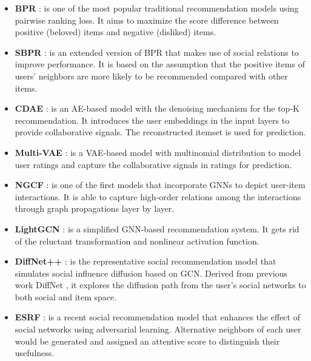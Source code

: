 \documentclass[letterpaper]{article} %
\begin{document}
\begin{itemize}
    \item \textbf{BPR} \cite{bpr}: is one of the most popular traditional recommendation models using pairwise ranking loss. It aims to maximize the score difference between positive (beloved) items and negative (disliked) items.
    \item \textbf{SBPR} \cite{sbpr}: is an extended version of BPR that makes use of social relations to improve performance. It is based on the assumption that the positive items of users' neighbors are more likely to be recommended compared with other items.
    \item \textbf{CDAE} \cite{cdae}: is an AE-based model with the denoising mechanism for the top-K recommendation. It introduces the user embeddings in the input layers to provide collaborative signals. The reconstructed itemset is used for prediction.
    \item \textbf{Multi-VAE} \cite{multivae}: is a VAE-based model with multinomial distribution to model user ratings and capture the collaborative signals in ratings for prediction.
    \item \textbf{NGCF} \cite{ngcf}: is one of the first models that incorporate GNNs to depict user-item interactions. It is able to capture high-order relations among the interactions through graph propagations layer by layer.
    \item \textbf{LightGCN} \cite{lightgcn}: is a simplified GNN-based recommendation system. It gets rid of the reluctant transformation and nonlinear activation function.
    \item \textbf{DiffNet++} \cite{diffnet++}: is the representative social recommendation model that simulates social influence diffusion based on GCN. Derived from previous work DiffNet \cite{diffnet}, it explores the diffusion path from the user's social networks to both social and item space.
    \item \textbf{ESRF} \cite{ESRF}: is a recent social recommendation model that enhances the effect of social networks using adversarial learning. Alternative neighbors of each user would be generated and assigned an attentive score to distinguish their usefulness.
\end{itemize}
\end{document}
